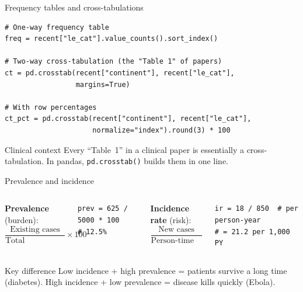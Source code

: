 \documentclass[aspectratio=169,11pt]{beamer}
\begin{document}
\begin{frame}[fragile]{Frequency tables and cross-tabulations}
\begin{verbatim}
# One-way frequency table
freq = recent["le_cat"].value_counts().sort_index()

# Two-way cross-tabulation (the "Table 1" of papers)
ct = pd.crosstab(recent["continent"], recent["le_cat"],
                 margins=True)

# With row percentages
ct_pct = pd.crosstab(recent["continent"], recent["le_cat"],
                     normalize="index").round(3) * 100
\end{verbatim}

\vspace{4pt}
\begin{exampleblock}{Clinical context}
Every ``Table~1'' in a clinical paper is essentially a cross-tabulation. In pandas, \texttt{pd.crosstab()} builds them in one line.
\end{exampleblock}
\end{frame}

\begin{frame}[fragile]{Prevalence and incidence}
\begin{columns}
\textbf{Prevalence} (burden):
$$\frac{\text{Existing cases}}{\text{Total population}} \times 100$$

\begin{verbatim}
prev = 625 / 5000 * 100
# 12.5%
\end{verbatim}

\textbf{Incidence rate} (risk):
$$\frac{\text{New cases}}{\text{Person-time at risk}}$$

\begin{verbatim}
ir = 18 / 850  # per person-year
# = 21.2 per 1,000 PY
\end{verbatim}
\end{columns}

\vspace{8pt}
\begin{alertblock}{Key difference}
Low incidence + high prevalence = patients survive a long time (diabetes). High incidence + low prevalence = disease kills quickly (Ebola).
\end{alertblock}
\end{frame}
\end{document}

